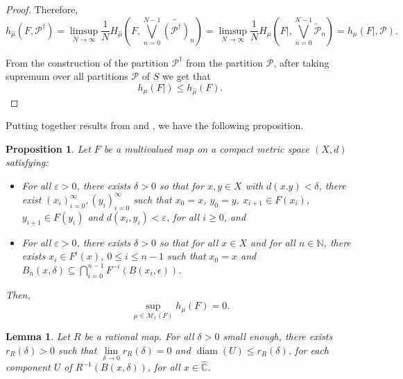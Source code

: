 \documentclass[11pt,letterpaper]{article}
\newtheorem{proposition}[theorem]{Proposition}
\newtheorem{lemma}[theorem]{Lemma}
\theoremstyle{definition}
\begin{document}
\begin{proof}
Therefore,
$$h_{\hat{\mu}}\left(F,\mathcal{P}^\dagger\right)=\limsup\limits_{N\to\infty}\frac{1}{N}H_{\hat{\mu}}\left(F,\bigvee\limits_{n=0}^{N-1}\widetilde{(\mathcal{P}^\dagger)}_n\right)=\limsup\limits_{N\to\infty}\frac{1}{N}H_{\mu}\left(F|,\bigvee\limits_{n=0}^{N-1}\widetilde{\mathcal{P}}_n\right)=h_{\mu}\left(F|,\mathcal{P}\right).$$

From the construction of the partition $\mathcal{P}^\dagger$ from the partition $\mathcal{P}$, after taking supremum over all partitions $\mathcal{P}$ of $S$ we get that
$$h_{\mu}(F|)\leq h_{\hat{\mu}}(F).$$
\end{proof}

Putting together results from \cite{CarMetMor15} and \cite{VivSir22}, we have the following proposition.

\begin{proposition}\label{entropy0} 
Let $F$ be a multivalued map on a compact metric space $(X,d)$ satisfying:
\begin{itemize}
\item[(i)] For all $\varepsilon >0$, there exists $\delta >0$ so that for $x,y\in X$ with $d(x.y)<\delta$, there exist $(x_i)_{i=0}^{\infty}, (y_i)_{i=0}^{\infty}$ such that $x_0=x$, $y_0=y$, $x_{i+1}\in F(x_i)$, $y_{i+1}\in F(y_i)$ and $d(x_i,y_i)<\varepsilon$, for all $i\geq 0$, and
\item[(ii)] For all $\varepsilon>0$, there exists $\delta>0$ so that for all $x\in X$ and for all $n\in\mathbb{N}$, there exists $x_i\in F^i(x)$, $0\leq i\leq n-1$ such that $x_0=x$ and $B_n(x,\delta)\subseteq\bigcap_{i=0}^{n-1} F^{-i}(B(x_i,\epsilon))$.
\end{itemize}
Then, $$\sup\limits_{\mu\in\mathcal{M}_1(F)}h_{\mu}(F)=0.$$
\end{proposition}

\begin{lemma}\label{radius}
Let $R$ be a rational map. For all $\delta>0$ small enough, there exists $r_R(\delta)>0$ such that $\lim\limits_{\delta\to 0}r_R(\delta)=0$ and $\operatorname{diam}(U)\leq r_R(\delta)$, for each component $U$ of $R^{-1}(B(x,\delta))$, for all $x\in\widehat{\mathbb{C}}$.
\end{lemma}
\end{document}
